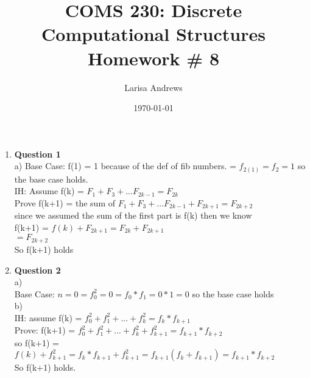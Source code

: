\documentclass[12pt]{article}
\begin{document}

\title{
\textbf{COMS 230: Discrete Computational Structures}\\
Homework \# 8 \\}
\author{Larisa Andrews}
\date{\today}
\maketitle

\begin{enumerate}

\item {\bf Question 1} \\
a) 
	Base Case: f(1) = 1 because of the def of fib numbers. = $f_{2(1)} = f_2 = 1$ so the base case holds. \\
	IH: Assume f(k) = $F_1 + F_3 + ... F_{2k-1} = F_{2k}$ \\
	Prove f(k+1) = the sum of $F_1 + F_3 + ... F_{2k-1} + F_{2k+1} = F_{2k+2}$\\
	 since we assumed the sum of the first part is f(k) then we know \\
	 f(k+1) = $f(k) + F_{2k+1} = F_{2k} + F_{2k+1}$ \\
	 $ = F_{2k+2}$ \\
	 So f(k+1) holds \\
	

\item {\bf Question 2} \\
a) \\ 
Base Case: $n = 0 = f_0^2 = 0 = f_0 * f_1 = 0 *1 = 0$ so the base case holds \\
b) \\
IH: assume f(k) = $ f_0^2 + f_1^2 + ... + f_k^2 = f_k * f_{k+1} $ \\
Prove: f(k+1) = $ f_0^2 + f_1^2 + ... + f_k^2 + f_{k+1}^2 = f_{k+1} * f_{k+2}$ \\
so f(k+1) = $f(k) + f_{k+1}^2 = f_k * f_{k+1} + f_{k+1}^2 = f_{k+1}(f_k + f_{k+1}) = f_{k+1} * f_{k+2}$ \\
So f(k+1) holds.\\ 


\end{enumerate}
\end{document}
